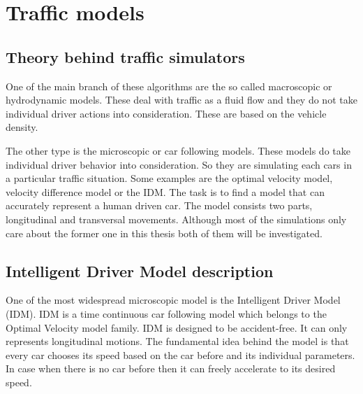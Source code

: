 \documentclass[a4paper,12pt,twoside]{report} %
\begin{document}
	\chapter{Traffic models}
		\section{Theory behind traffic simulators}
			One of the main branch of these algorithms are the so called macroscopic or hydrodynamic models. These deal with traffic as a fluid flow and they do not take individual driver actions into consideration. These are based on the vehicle density.

			The other type is the microscopic or car following models. These models do take individual driver behavior into consideration. So they are simulating each cars in a particular traffic situation. Some examples are the optimal velocity model, velocity difference model or the IDM. The task is to find a model that can accurately represent a human driven car. The model consists two parts, longitudinal and transversal movements. Although most of the simulations only care about the former one in this thesis both of them will be investigated.
		\section{Intelligent Driver Model description} \label{sec:IDM}
			One of the most widespread microscopic model is the Intelligent Driver Model (IDM). IDM is a time continuous car following model which belongs to the Optimal Velocity model family. IDM is designed to be accident-free. It can only represents longitudinal motions. The fundamental idea behind the model is that every car chooses its speed based on the car before and its individual parameters. In case when there is no car before then it can freely accelerate to its desired speed.
\end{document}
